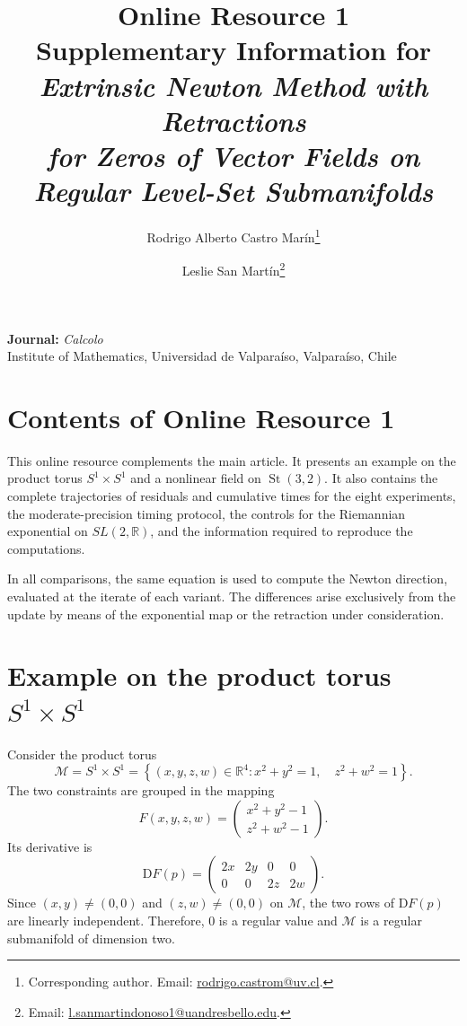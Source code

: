 \documentclass[11pt]{article}
\title{Online Resource 1\\
Supplementary Information for\\
\textit{Extrinsic Newton Method with Retractions\\
for Zeros of Vector Fields on Regular Level-Set Submanifolds}}
\author{Rodrigo Alberto Castro Mar\'in\thanks{Corresponding author. Email: \href{mailto:rodrigo.castrom@uv.cl}{rodrigo.castrom@uv.cl}.}
\and Leslie San Mart\'in\thanks{Email: \href{mailto:l.sanmartindonoso1@uandresbello.edu}{l.sanmartindonoso1@uandresbello.edu}.}}
\date{}
\newcommand{\R}{\mathbb{R}}
\newcommand{\M}{\mathcal{M}}
\newcommand{\D}{\mathrm{D}}
\begin{document}
\maketitle
\begin{center}
\small
\textbf{Journal:} \textit{Calcolo}\\
Institute of Mathematics, Universidad de Valpara\'iso, Valpara\'iso, Chile
\end{center}

\section*{Contents of Online Resource 1}
This online resource complements the main article. It presents an example on
the product torus $S^1\times S^1$ and a nonlinear field on
$\operatorname{St}(3,2)$. It also contains the complete trajectories of
residuals and cumulative times for the eight experiments, the moderate-precision
timing protocol, the controls for the Riemannian exponential on
$SL(2,\R)$, and the information required to reproduce the computations.

In all comparisons, the same equation is used to compute the Newton
direction, evaluated at the iterate of each variant. The differences arise
exclusively from the update by means of the exponential map or the retraction
under consideration.

\section[Example on the product torus]{Example on the product torus $S^1\times S^1$}
\label{sec:product_torus}

Consider the product torus
\begin{equation}\label{eq:product_torus}
    \M
    =
    S^1\times S^1
    =
    \left\{
        (x,y,z,w)\in\R^4:
        x^2+y^2=1,\quad z^2+w^2=1
    \right\}.
\end{equation}
The two constraints are grouped in the mapping
\begin{equation}\label{eq:F_product_torus}
    F(x,y,z,w)
    =
    \begin{pmatrix}
        x^2+y^2-1\\
        z^2+w^2-1
    \end{pmatrix}.
\end{equation}
Its derivative is
\begin{equation}\label{eq:DF_product_torus}
    \D F(p)
    =
    \begin{pmatrix}
        2x&2y&0&0\\
        0&0&2z&2w
    \end{pmatrix}.
\end{equation}
Since $(x,y)\neq(0,0)$ and $(z,w)\neq(0,0)$ on $\M$, the two rows of
$\D F(p)$ are linearly independent. Therefore, $0$ is a regular value and
$\M$ is a regular submanifold of dimension two.
\end{document}
